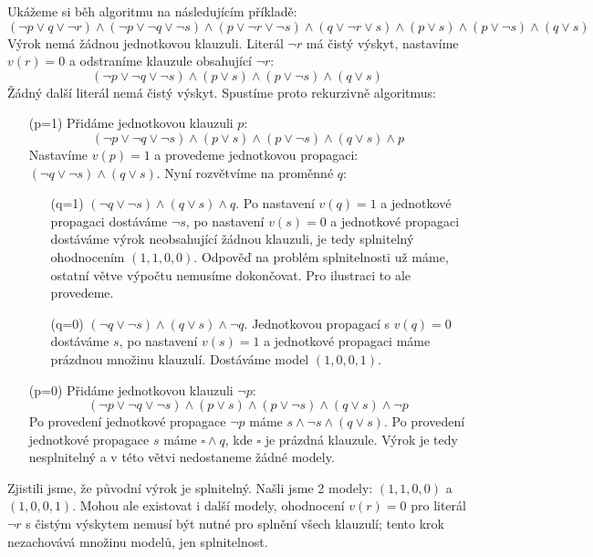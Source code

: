 \begin{example}
    Ukážeme si běh algoritmu na následujícím příkladě:
    $$
    (\neg p\lor q\lor \neg r)\land(\neg p\lor\neg q\lor\neg s)\land(p\lor \neg r\lor \neg s)\land(q\lor \neg r\lor s)\land (p\lor s)\land(p\lor\neg s)\land(q\lor s)
    $$
    Výrok nemá žádnou jednotkovou klauzuli. Literál $\neg r$ má čistý výskyt, nastavíme  $v(r)=0$ a odstraníme klauzule obsahující $\neg r$:
    $$
    (\neg p\lor\neg q\lor\neg s)\land (p\lor s)\land(p\lor\neg s)\land(q\lor s)
    $$
    Žádný další literál nemá čistý výskyt. Spustíme proto rekurzivně algoritmus:
    \begin{itemize}
        \item[(p=1)] Přidáme jednotkovou klauzuli $p$:
        $$
        (\neg p\lor\neg q\lor\neg s)\land (p\lor s)\land(p\lor\neg s)\land(q\lor s)\land p
        $$
        Nastavíme $v(p)=1$ a provedeme jednotkovou propagaci: $(\neg q\lor\neg s)\land(q\lor s)$. Nyní rozvětvíme na proměnné $q$:
        \begin{itemize}
            \item[(q=1)] $(\neg q\lor\neg s)\land(q\lor s)\land q$. Po nastavení $v(q)=1$ a jednotkové propagaci dostáváme $\neg s$, po nastavení $v(s)=0$ a jednotkové propagaci dostáváme výrok neobsahující žádnou klauzuli, je tedy splnitelný ohodnocením $(1,1,0,0)$. Odpověď na problém splnitelnosti už máme, ostatní větve výpočtu nemusíme dokončovat. Pro ilustraci to ale provedeme.
            \item[(q=0)] $(\neg q\lor\neg s)\land(q\lor s)\land \neg q$. Jednotkovou propagací s $v(q)=0$ dostáváme $s$, po nastavení $v(s)=1$ a jednotkové propagaci máme prázdnou množinu klauzulí. Dostáváme model $(1,0,0,1)$.
            
        \end{itemize}
        \item[(p=0)] Přidáme jednotkovou klauzuli $\neg p$:
        $$
        (\neg p\lor\neg q\lor\neg s)\land (p\lor s)\land(p\lor\neg s)\land(q\lor s)\land \neg p
        $$
        Po provedení jednotkové propagace $\neg p$ máme $s\land \neg s\land(q\lor s)$. Po provedení jednotkové propagace $s$ máme $\square\land q$, kde $\square$ je prázdná klauzule. Výrok je tedy nesplnitelný a v této větvi nedostaneme žádné modely. 
    \end{itemize}

Zjistili jsme, že původní výrok je splnitelný. Našli jsme 2 modely: $(1,1,0,0)$ a $(1,0,0,1)$. Mohou ale existovat i další modely, ohodnocení $v(r)=0$ pro literál $\neg r$ s čistým výskytem nemusí být nutné pro splnění všech klauzulí; tento krok nezachovává množinu modelů, jen splnitelnost.    
\end{example}

